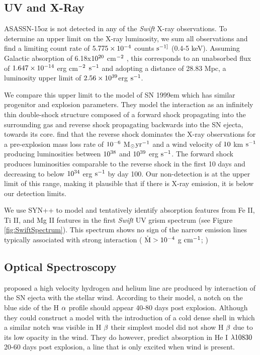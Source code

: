 \documentclass[a4paper,fleqn,usenatbib]{mnras}
\newcommand{\msunperiod}{M$\rm{_{\odot}}$}
\begin{document}
\subsection{UV and X-Ray}
ASASSN-15oz is not detected in any of the \textit{Swift} X-ray observations. 
To determine an upper limit on the X-ray luminosity, we sum all observations and find a limiting count rate of  $\rm{5.775\times10^{-4}}$ counts $\rm{s^{-1]}}$ (0.4-5 keV).
Assuming Galactic absorption of 6.18x$\rm{10^{20}}$ cm$\rm{^{-2}}$ \citep{2005kalberla}, this corresponds to an unabsorbed flux of $\rm{1.647\times10^{-14}}$ erg cm$\rm{^{-2}}$ $\rm{s^{-1}}$ and adopting a distance of 28.83 Mpc, a luminosity upper limit of $\rm{2.56 \times10^{39}}$erg $\rm{s^{-1}}$.

We compare this upper limit to the model of SN 1999em \citep{2007chugai} which has similar progenitor and explosion parameters. 
They model the interaction as an infinitely thin double-shock structure \citep{1982chevalier, 1985nadyozhin} composed of a forward shock propagating into the surrounding gas and reverse shock propagating backwards into the SN ejecta, towards its core. 
\citet{2007chugai} find that the reverse shock dominates the X-ray observations for a pre-explosion mass loss rate of $\rm{10^{-6}}$ \msunperiod $\rm{yr^{-1}}$ and a wind velocity of $\rm{10}$ km $\rm{s^{-1}}$ producing luminosities between $\rm{10^{38}}$ and $\rm{10^{39}}$ erg $\rm{s^{-1}}$. 
The forward shock produces luminosities comparable to the reverse shock in the first 10 days and decreasing to below $\rm{10^{34}}$ erg $\rm{s^{-1}}$ by day 100.  
Our non-detection is at the upper limit of this range, making it plausible that if there is X-ray emission, it is below our detection limits.

We use SYN++ to model and tentatively identify absorption features from Fe II, Ti II, and Mg II features in the first {\it Swift} UV grism spectrum (see Figure \ref{fig:SwiftSpectrum}). 
This spectrum shows no sign of the narrow emission lines typically associated with strong interaction ( $\rm{\dot{M}>10^{-4}}$ g $\rm{cm^{-1}}$; \citealt{2012kiewe})
\subsection{Optical Spectroscopy} \label{sec:cachito}
\citet{2007chugai} proposed a high velocity hydrogen and helium line are produced by interaction of the SN ejecta with the stellar wind. 
According to their model, a notch on the blue side of the H $\rm{\alpha}$ profile should appear 40-80 days post explosion.
Although they could construct a model with the introduction of a cold dense shell in which a similar notch was visible in H $\rm{\beta}$ their simplest model did not show H $\rm{\beta}$ due to its low opacity in the wind.
They do however, predict absorption in He I $\rm{\lambda10830}$ 20-60 days post explosion, a line that is only excited when wind is present. 
\end{document}
